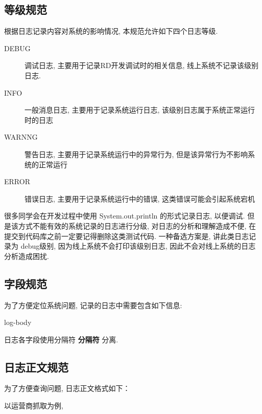 \documentclass[UTF8,fntef]{ctexart}
\begin{document}
	\subsection{等级规范}
	根据日志记录内容对系统的影响情况, 本规范允许如下四个日志等级.
	
	\begin{description}
		\item[DEBUG] 调试日志, 主要用于记录RD开发调试时的相关信息, 线上系统不记录该级别日志.
		\item[INFO]	一般消息日志, 主要用于记录系统运行日志, 该级别日志属于系统正常运行时的日志
		\item[WARNNG] 警告日志, 主要用于记录系统运行中的异常行为, 但是该异常行为不影响系统的正常运行
		\item[ERROR] 错误日志, 主要用于记录系统运行中的错误, 这类错误可能会引起系统宕机
	\end{description}
	
	很多同学会在开发过程中使用 System.out.println 的形式记录日志, 以便调试. 但是该方式不能有效的系统记录的日志进行分级, 
	对日志的分析和理解造成不便, 在提交到代码库之前一定要记得删除这类测试代码. 一种备选方案是, 讲此类日志记录为 debug级别,
	因为线上系统不会打印该级别日志, 因此不会对线上系统的日志分析造成困扰.
	
	\subsection{字段规范}
	为了方便定位系统问题, 记录的日志中需要包含如下信息: 
	\begin{spverbatim}
 log-body
	\end{spverbatim}
	
	日志各字段使用分隔符 \textbf{分隔符} 分离.	
	
	\subsection{日志正文规范}
	为了方便查询问题, 	日志正文格式如下：
	
	\begin{spverbatim}
	\end{spverbatim}
	
	
	以运营商抓取为例, 
	
\end{document}
